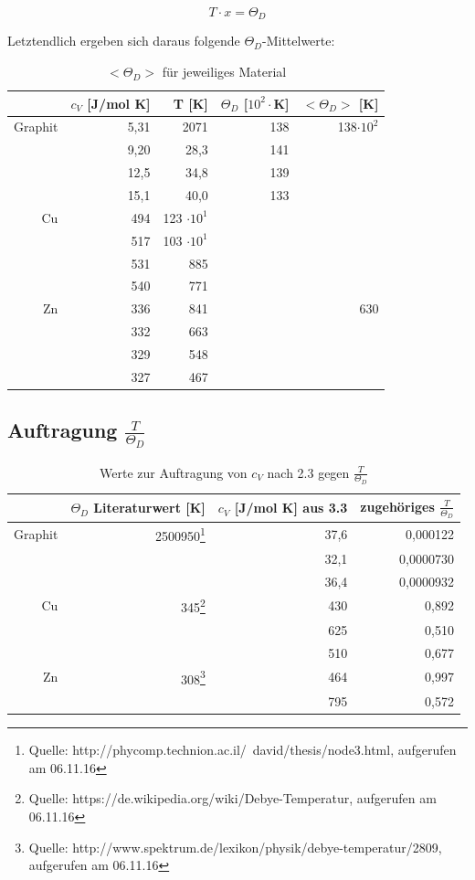 \documentclass[12pt,a4paper,titlepage,headinclude,bibtotoc]{scrartcl}
\begin{document}
\begin{equation}
T \cdot x = \Theta_D
\end{equation}

Letztendlich ergeben sich daraus folgende $\Theta_D$-Mittelwerte:\\


\begin{table} [h]\caption{$<\Theta_D>$ für jeweiliges Material}
\begin{tabular} {r | r|  r |r |r}
& $c_V$ [J/mol K] & T	[K] &$\Theta_D$ [$10^2\cdot$K]	&$<\Theta_D>$ [K]\\
\hline
Graphit &5,31	&2071	&138&	138$\cdot10^2$\\
        &9,20	&28,3&	141\\	
        &12,5&	34,8&	139\\	
        &15,1	&40,0	&133\\
\hline						
Cu &494 &	123 $\cdot 10^1$\\
&517 &	103 $\cdot 10^1$\\
&531 &	885\\	
&540 &	771\\	
\hline		
Zn& 336&	841&	&630\\
&332 &	663\\	
&329&	548\\
&327&	467\\
\end{tabular}
\end{table}


\subsection{Auftragung $\frac{T}{\Theta_D}$}

\begin{table} [h]
\centering
\caption{Werte zur Auftragung von $c_V$ nach 2.3 gegen $\frac{T}{\Theta_D}$}
\begin{tabular} {r | r |r | r }
&$\Theta_D$ Literaturwert [K] &$c_V$ [J/mol K] aus 3.3& zugehöriges $\frac{T}{\Theta_D}$ \\
\hline
Graphit& 2500950\protect\footnote{Quelle: http://phycomp.technion.ac.il/~david/thesis/node3.html, aufgerufen am 06.11.16} &37,6&0,000122 \\
&&32,1& 0,0000730 \\
&&36,4& 0,0000932 \\
Cu&345\protect\footnote{Quelle: https://de.wikipedia.org/wiki/Debye-Temperatur, aufgerufen am 06.11.16} &430& 0,892 \\
&&625& 0,510\\
&&510& 0,677\\
Zn&308\protect\footnote{Quelle: http://www.spektrum.de/lexikon/physik/debye-temperatur/2809, aufgerufen am 06.11.16} &464& 0,997\\
&&795& 0,572\\
\end{tabular}
\end{table}
\end{document}
